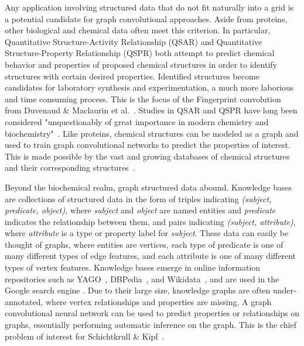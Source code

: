 Any application involving structured data that do not fit naturally into a grid is a potential candidate for graph convolutional approaches.
Aside from proteins, other biological and chemical data often meet this criterion.
In particular, Quantitative Structure-Activity Relationship (QSAR) and Quantitative Structure-Property Relationship (QSPR) both attempt to predict chemical behavior and properties of proposed chemical structures in order to identify structures with certain desired properties. 
Identified structures become candidates for laboratory synthesis and experimentation, a much more laborious and time consuming process. 
This is the focus of the Fingerprint convolution from Duvenaud \& Maclaurin et al.~\cite{duvenaud2015}.
Studies in QSAR and QSPR have long been considered "unquestionably of great importance in modern chemistry and biochemistry"~\cite{karelson1996}.
Like proteins, chemical structures can be modeled as a graph and used to train graph convolutional networks to predict the properties of interest.
This is made possible by the vast and growing databases of chemical structures and their corresponding structures~\cite{olah2008, judson2008}.

Beyond the biochemical realm, graph structured data abound.
Knowledge bases are collections of structured data in the form of triples indicating \emph{(subject, predicate, object)}, where \emph{subject} and \emph{object} are named entities and \emph{predicate} indicates the relationship between them, and pairs indicating \emph{(subject, attribute)}, where \emph{attribute} is a type or property label for \emph{subject}.
These data can easily be thought of graphs, where entities are vertices, each type of predicate is one of many different types of edge features, and each attribute is one of many different types of vertex features.
Knowledge bases emerge in online information repositories such as YAGO~\cite{mahdisoltani2014}, DBPedia~\cite{auer2007}, and Wikidata~\cite{vrandevcic2014}, and are used in the Google search engine \cite{singhal2012}.
Due to their large size, knowledge graphs are often under-annotated, where vertex relationships and properties are missing. 
A graph convolutional neural network can be used to predict properties or relationships on graphs, essentially performing automatic inference on the graph.
This is the chief problem of interest for Schichtkrull \& Kipf~\cite{schlichtkrull2017}.



